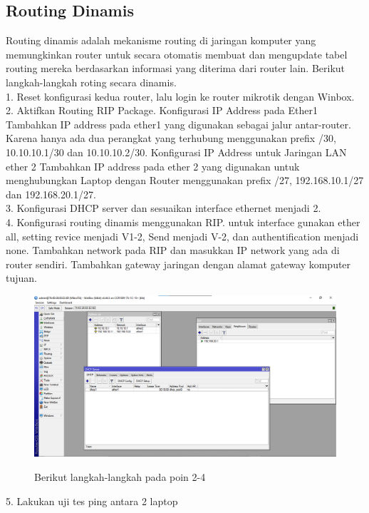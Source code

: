 \subsection{Routing Dinamis}
Routing dinamis adalah mekanisme routing di jaringan komputer yang memungkinkan router untuk secara otomatis membuat dan mengupdate tabel routing mereka berdasarkan informasi yang diterima dari router lain. Berikut langkah-langkah roting secara dinamis. \\
1. Reset konfigurasi kedua router, lalu login ke router mikrotik dengan Winbox. \\
2. Aktifkan Routing RIP Package. Konfigurasi IP Address pada Ether1 Tambahkan IP address pada ether1 yang digunakan sebagai jalur antar-router. Karena hanya ada dua perangkat yang terhubung menggunakan prefix /30, 10.10.10.1/30 dan 10.10.10.2/30. Konfigurasi IP Address untuk Jaringan LAN ether 2 Tambahkan IP address pada ether 2 yang digunakan untuk menghubungkan Laptop dengan Router menggunakan prefix /27, 192.168.10.1/27 dan 192.168.20.1/27. \\
3. Konfigurasi DHCP server dan sesuaikan interface ethernet menjadi 2. \\
4. Konfigurasi routing dinamis menggunakan RIP. untuk interface gunakan ether all, setting revice menjadi V1-2, Send menjadi V-2, dan authentification menjadi none. Tambahkan network pada RIP dan masukkan IP network yang ada di router sendiri. Tambahkan gateway jaringan dengan alamat gateway komputer tujuan. \\ 
\begin{figure}[H]
    \centering
    \includegraphics[width=0.65\linewidth]{image/routing4.png}
    \label{fig:inirujukan}
    \caption{Berikut langkah-langkah pada poin 2-4}
\end{figure}
5. Lakukan uji tes ping antara 2 laptop 
